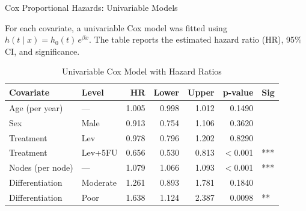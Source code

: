 \documentclass[aspectratio=169, 10pt]{beamer}
\begin{document}

\begin{frame}{Cox Proportional Hazards: Univariable Models}

For each covariate, a univariable Cox model was fitted using
$h(t \mid x) = h_0(t)\,e^{\beta x}$.
The table reports the estimated hazard ratio (HR), 95\% CI,
and significance.

\bigskip
\begin{center}
\small
\begin{table}[ht]  %
	\caption{Univariable Cox Model with Hazard Ratios}  %
	\begin{center}
		\small
		
		
		   \begin{tabular}{@{}llrrrrl@{}}
			\toprule
			\textbf{Covariate} & \textbf{Level} & \textbf{HR}
			& \textbf{Lower} & \textbf{Upper}
			& \textbf{p-value} & \textbf{Sig} \\
			\midrule
			Age (per year)   & ---      & 1.005 & 0.998 & 1.012 & 0.1490 & \\
			Sex              & Male     & 0.913 & 0.754 & 1.106 & 0.3620 & \\
			Treatment        & Lev      & 0.978 & 0.796 & 1.202 & 0.8290 & \\
			Treatment        & Lev+5FU  & 0.656 & 0.530 & 0.813 & \alert{$<$0.001} & \alert{***} \\
			Nodes (per node) & ---      & 1.079 & 1.066 & 1.093 & \alert{$<$0.001} & \alert{***} \\
			Differentiation  & Moderate & 1.261 & 0.893 & 1.781 & 0.1840 & \\
			Differentiation  & Poor     & 1.638 & 1.124 & 2.387 & \alert{0.0098} & \alert{**} \\
			\bottomrule
		\end{tabular}
		

\end{center}
\end{table}
\end{center}
\end{frame}
\end{document}
